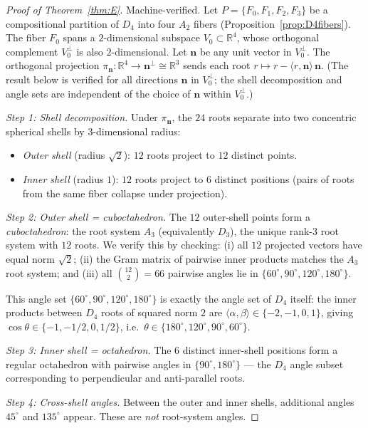 \documentclass[11pt,reqno]{amsart}
\theoremstyle{plain}
\theoremstyle{definition}
\theoremstyle{remark}
\newcommand{\R}{\mathbb{R}}
\begin{document}
\begin{proof}[Proof of Theorem~\ref{thm:E}]
Machine-verified.
Let $P = \{F_0, F_1, F_2, F_3\}$ be a compositional partition
of $D_4$ into four $A_2$ fibers
(Proposition~\ref{prop:D4fibers}).
The fiber $F_0$ spans a $2$-dimensional subspace
$V_0 \subset \R^4$, whose orthogonal complement $V_0^\perp$
is also $2$-dimensional.
Let $\mathbf{n}$ be any unit vector in $V_0^\perp$.
The orthogonal projection
$\pi_{\mathbf{n}} \colon \R^4 \to \mathbf{n}^\perp \cong \R^3$
sends each root $r \mapsto r - \langle r, \mathbf{n}\rangle
\,\mathbf{n}$.
(The result below is verified for all directions $\mathbf{n}$
in $V_0^\perp$; the shell decomposition and angle sets are
independent of the choice of $\mathbf{n}$ within $V_0^\perp$.)

\emph{Step 1: Shell decomposition.}
Under $\pi_{\mathbf{n}}$, the $24$ roots separate into
two concentric spherical shells by $3$-dimensional radius:
\begin{itemize}
\item \emph{Outer shell} (radius $\sqrt{2}$):
  $12$ roots project to $12$ distinct points.
\item \emph{Inner shell} (radius $1$):
  $12$ roots project to $6$ distinct positions
  (pairs of roots from the same fiber collapse under projection).
\end{itemize}

\emph{Step 2: Outer shell = cuboctahedron.}
The $12$ outer-shell points form a \emph{cuboctahedron}:
the root system $A_3$ (equivalently $D_3$), the unique
rank-$3$ root system with $12$ roots.
We verify this by checking:
(i) all $12$ projected vectors have equal norm $\sqrt{2}$;
(ii) the Gram matrix of pairwise inner products matches
the $A_3$ root system; and
(iii) all $\binom{12}{2} = 66$ pairwise angles lie in
$\{60^\circ, 90^\circ, 120^\circ, 180^\circ\}$.

This angle set $\{60^\circ, 90^\circ, 120^\circ, 180^\circ\}$
is exactly the angle set of $D_4$ itself: the inner products
between $D_4$ roots of squared norm $2$ are
$\langle \alpha, \beta \rangle \in \{-2, -1, 0, 1\}$,
giving $\cos\theta \in \{-1, -1/2, 0, 1/2\}$,
i.e.\ $\theta \in \{180^\circ, 120^\circ, 90^\circ, 60^\circ\}$.

\emph{Step 3: Inner shell = octahedron.}
The $6$ distinct inner-shell positions form a regular
octahedron with pairwise angles in $\{90^\circ, 180^\circ\}$
--- the $D_4$ angle subset corresponding to perpendicular
and anti-parallel roots.

\emph{Step 4: Cross-shell angles.}
Between the outer and inner shells, additional angles
$45^\circ$ and $135^\circ$ appear.
These are \emph{not} root-system angles.
\end{proof}
\end{document}

